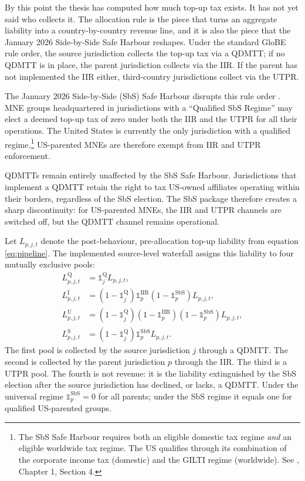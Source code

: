 \documentclass[11pt,a4paper]{article}
\begin{document}
By this point the thesis has computed how much top-up tax exists. It has not yet said who collects it. The allocation rule is the piece that turns an aggregate liability into a country-by-country revenue line, and it is also the piece that the January 2026 Side-by-Side Safe Harbour reshapes. Under the standard GloBE rule order, the source jurisdiction collects the top-up tax via a QDMTT; if no QDMTT is in place, the parent jurisdiction collects via the IIR. If the parent has not implemented the IIR either, third-country jurisdictions collect via the UTPR.

The January 2026 Side-by-Side (SbS) Safe Harbour disrupts this rule order \citep{oecd2026}. MNE groups headquartered in jurisdictions with a ``Qualified SbS Regime'' may elect a deemed top-up tax of zero under both the IIR and the UTPR for all their operations. The United States is currently the only jurisdiction with a qualified regime.\footnote{The SbS Safe Harbour requires both an eligible domestic tax regime \emph{and} an eligible worldwide tax regime. The US qualifies through its combination of the corporate income tax (domestic) and the GILTI regime (worldwide). See \citet{oecd2026}, Chapter 1, Section 4.} US-parented MNEs are therefore exempt from IIR and UTPR enforcement.

QDMTTs remain entirely unaffected by the SbS Safe Harbour. Jurisdictions that implement a QDMTT retain the right to tax US-owned affiliates operating within their borders, regardless of the SbS election. The SbS package therefore creates a sharp discontinuity: for US-parented MNEs, the IIR and UTPR channels are switched off, but the QDMTT channel remains operational. 

Let $L_{p,j,t}$ denote the post-behaviour, pre-allocation top-up liability from equation \eqref{eq:pipeline}. The implemented source-level waterfall assigns this liability to four mutually exclusive pools:
\begin{align}
L_{p,j,t}^{\text{Q}} &= \mathbb{1}_j^{\text{Q}} L_{p,j,t}, \label{eq:qdmtt_sbs} \\
L_{p,j,t}^{\text{I}} &= (1-\mathbb{1}_j^{\text{Q}})\mathbb{1}_p^{\text{IIR}}(1-\mathbb{1}_p^{\text{SbS}})L_{p,j,t}, \label{eq:iir_sbs} \\
L_{p,j,t}^{\text{U}} &= (1-\mathbb{1}_j^{\text{Q}})(1-\mathbb{1}_p^{\text{IIR}})(1-\mathbb{1}_p^{\text{SbS}})L_{p,j,t}, \label{eq:utpr_sbs} \\
L_{p,j,t}^{\text{S}} &= (1-\mathbb{1}_j^{\text{Q}})\mathbb{1}_p^{\text{SbS}}L_{p,j,t}. \label{eq:sbs_extinguish}
\end{align}
The first pool is collected by the source jurisdiction $j$ through a QDMTT. The second is collected by the parent jurisdiction $p$ through the IIR. The third is a UTPR pool. The fourth is not revenue: it is the liability extinguished by the SbS election after the source jurisdiction has declined, or lacks, a QDMTT. Under the universal regime $\mathbb{1}_p^{\text{SbS}}=0$ for all parents; under the SbS regime it equals one for qualified US-parented groups.
\end{document}
